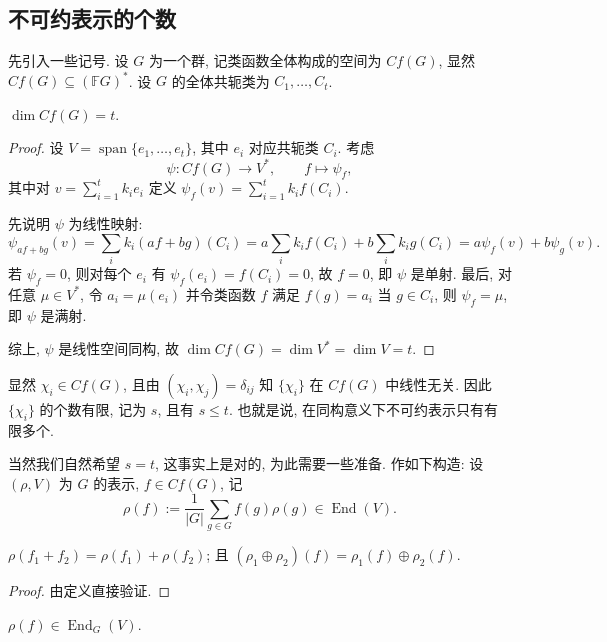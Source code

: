 \subsection{不可约表示的个数}

先引入一些记号. 设 $G$ 为一个群, 记类函数全体构成的空间为 $Cf(G)$,
显然 $Cf(G)\subseteq(\mathbb{F}G)^*$. 设 $G$ 的全体共轭类为 $C_1,\dots,C_t$.

\begin{proposition}\label{prop:class-functions-dim}
$\dim Cf(G)=t$.
\end{proposition}

\begin{proof}
设 $V=\operatorname{span}\{e_1,\dots,e_t\}$, 其中 $e_i$ 对应共轭类 $C_i$. 考虑
\[
  \psi\colon Cf(G)\longrightarrow V^*,\qquad f\longmapsto \psi_f,
\]
其中对 $v=\sum_{i=1}^{t}k_ie_i$ 定义 $\psi_f(v)=\sum_{i=1}^{t}k_if(C_i)$.

先说明 $\psi$ 为线性映射:
\[
  \psi_{af+bg}(v)=\sum_i k_i(af+bg)(C_i)
  =a\sum_i k_if(C_i)+b\sum_i k_ig(C_i)=a\psi_f(v)+b\psi_g(v).
\]
若 $\psi_f=0$, 则对每个 $e_i$ 有 $\psi_f(e_i)=f(C_i)=0$, 故 $f=0$, 即 $\psi$ 是单射.
最后, 对任意 $\mu\in V^*$, 令 $a_i=\mu(e_i)$ 并令类函数 $f$ 满足 $f(g)=a_i$
当 $g\in C_i$, 则 $\psi_f=\mu$, 即 $\psi$ 是满射.

综上, $\psi$ 是线性空间同构, 故 $\dim Cf(G)=\dim V^*=\dim V=t$.
\end{proof}

\begin{remark}\label{rem:char-independent}
显然 $\chi_i\in Cf(G)$, 且由 $(\chi_i,\chi_j)=\delta_{ij}$ 知 $\{\chi_i\}$ 在 $Cf(G)$
中线性无关. 因此 $\{\chi_i\}$ 的个数有限, 记为 $s$, 且有 $s\le t$. 也就是说,
在同构意义下不可约表示只有有限多个.
\end{remark}

当然我们自然希望 $s=t$, 这事实上是对的, 为此需要一些准备. 作如下构造:
设 $(\rho,V)$ 为 $G$ 的表示, $f\in Cf(G)$, 记
\[
  \rho(f):=\frac{1}{|G|}\sum_{g\in G}f(g)\rho(g)\in\operatorname{End}(V).
\]

\begin{lemma}\label{lem:rho-f-linear}
$\rho(f_1+f_2)=\rho(f_1)+\rho(f_2)$; 且
$(\rho_1\oplus\rho_2)(f)=\rho_1(f)\oplus\rho_2(f)$.
\end{lemma}

\begin{proof}
由定义直接验证.
\end{proof}

\begin{lemma}\label{lem:rho-f-intertwine}
$\rho(f)\in\operatorname{End}_G(V)$.
\end{lemma}

